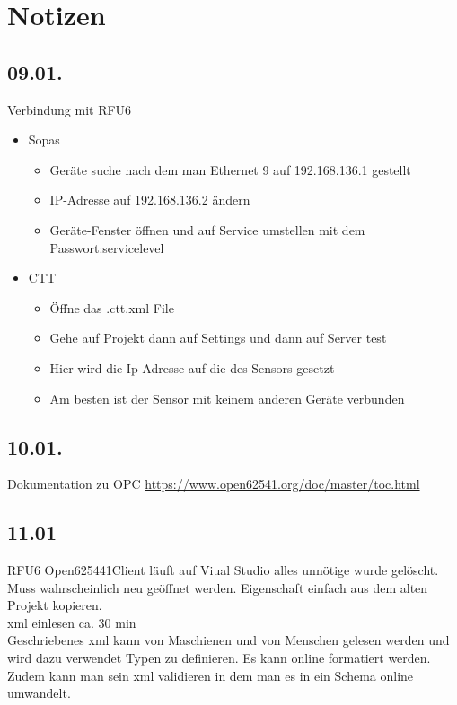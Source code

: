 \section{Notizen}

\subsection{09.01.}

Verbindung mit RFU6
\begin{itemize}
    \item Sopas
    \begin{itemize}
        \item [] Geräte suche nach dem man Ethernet 9 auf 192.168.136.1 gestellt
        \item [] IP-Adresse auf 192.168.136.2 ändern
        \item [] Geräte-Fenster öffnen und auf Service umstellen mit dem Passwort:servicelevel
    \end{itemize}
    \item CTT
    \begin{itemize}
        \item [] Öffne das .ctt.xml File
        \item [] Gehe auf Projekt dann auf Settings und dann auf Server test
        \item [] Hier wird die Ip-Adresse auf die des Sensors gesetzt
        \item [] Am besten ist der Sensor mit keinem anderen Geräte verbunden
    \end{itemize}
\end{itemize}

\subsection{10.01.}
Dokumentation zu OPC \url{https://www.open62541.org/doc/master/toc.html}

\subsection{11.01}
RFU6 Open625441Client läuft auf Viual Studio alles unnötige wurde gelöscht. 
Muss wahrscheinlich neu geöffnet werden. Eigenschaft einfach aus dem alten Projekt kopieren.\\
xml einlesen ca. 30 min \\
Geschriebenes xml kann von Maschienen und von Menschen gelesen werden und wird dazu verwendet Typen zu definieren. 
Es kann online formatiert werden. Zudem kann man sein xml validieren in dem man es in ein Schema online umwandelt.\\

